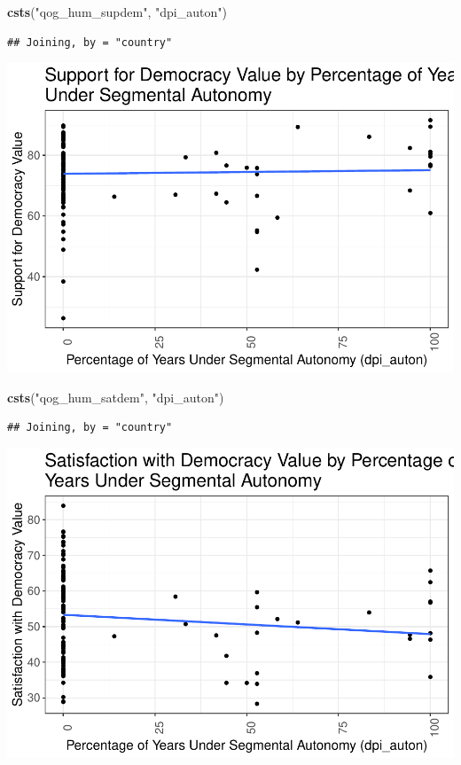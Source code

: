 \documentclass[
]{article}
\newenvironment{Shaded}{\begin{snugshade}}{\end{snugshade}}
\newcommand{\KeywordTok}[1]{\textcolor[rgb]{0.13,0.29,0.53}{\textbf{#1}}}
\newcommand{\NormalTok}[1]{#1}
\newcommand{\StringTok}[1]{\textcolor[rgb]{0.31,0.60,0.02}{#1}}
\begin{document}
\begin{Shaded}
\begin{Highlighting}[]
\KeywordTok{csts}\NormalTok{(}\StringTok{"qog_hum_supdem"}\NormalTok{, }\StringTok{"dpi_auton"}\NormalTok{)}
\end{Highlighting}
\end{Shaded}

\begin{verbatim}
## Joining, by = "country"
\end{verbatim}

\includegraphics{03_tjbrailey_data_analysis_files/figure-latex/unnamed-chunk-3-2.pdf}

\begin{Shaded}
\begin{Highlighting}[]
\KeywordTok{csts}\NormalTok{(}\StringTok{"qog_hum_satdem"}\NormalTok{, }\StringTok{"dpi_auton"}\NormalTok{)}
\end{Highlighting}
\end{Shaded}

\begin{verbatim}
## Joining, by = "country"
\end{verbatim}

\includegraphics{03_tjbrailey_data_analysis_files/figure-latex/unnamed-chunk-3-3.pdf}
\end{document}
